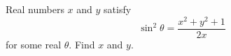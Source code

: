 Real numbers $x$ and $y$ satisfy
\[\sin^2\theta=\dfrac{x^2+y^2+1}{2x}\]
for some real $\theta$. Find $x$ and $y$.

